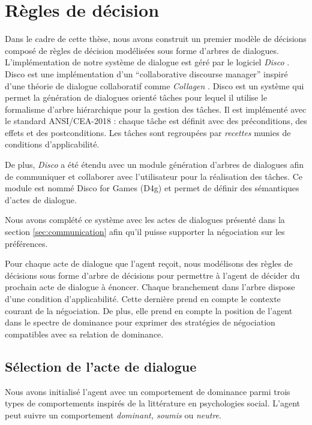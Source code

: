 	\section{Règles de décision}
	Dans le cadre de cette thèse, nous avons construit un premier modèle de décisions composé de règles de décision modélisées sous forme d'arbres de dialogues. L'implémentation de notre système de dialogue est géré par le logiciel \emph{Disco} \cite{rich09}. Disco est une implémentation d'un ``collaborative discourse manager'' inspiré d'une théorie de dialogue collaboratif comme \emph{Collagen} \cite{rich1997collagen}. Disco est un système qui permet la génération de dialogues orienté tâches pour lequel il utilise le formalisme d'arbre hiérarchique pour la gestion des tâches. Il est implémenté avec le standard ANSI/CEA-2018 : chaque tâche est définit avec des préconditions, des effets et des postconditions. Les tâches sont regroupées par \emph{recettes} munies de conditions d'applicabilité.
	
	De plus, \emph{Disco} a été étendu avec un module génération d'arbres de dialogues afin de communiquer et collaborer avec l'utilisateur pour la réalisation des tâches. Ce module est nommé Disco for Games (D4g) et permet de définir des sémantiques d'actes de dialogue. 
	
	Nous avons complété ce système avec les actes de dialogues présenté dans la section \ref{sec:communication} afin qu'il puisse supporter la négociation sur les préférences.
	
	Pour chaque acte de dialogue que l'agent reçoit, nous modélisons des règles de décisions sous forme d'arbre de décisions pour permettre à l'agent de décider du prochain acte de dialogue à énoncer.
	Chaque branchement dans l'arbre dispose d'une condition d'applicabilité. Cette dernière prend en compte le contexte courant de la négociation. De plus, elle prend en compte la position de l'agent dans le spectre de dominance pour exprimer des stratégies de négociation compatibles avec sa relation de dominance.

	
	
	\subsection{Sélection de l'acte de dialogue}
	Nous avons initialisé l'agent avec un comportement de dominance parmi trois types de comportements inspirés de la littérature en psychologies social.  L'agent peut suivre un comportement \emph{dominant, soumis} ou \emph{neutre}. 
	
